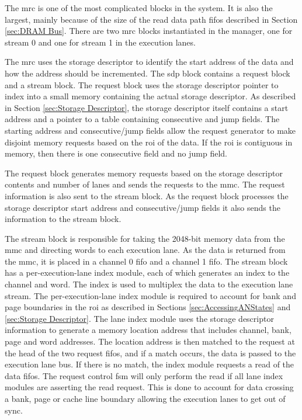 The \ac{mrc} is one of the most complicated blocks in the system.  It is also the largest, mainly because of the size of the read data path \acp{fifo} described in Section \ref{sec:DRAM Bus}.
There are two \ac{mrc} blocks instantiated in the manager, one for stream 0 and one for stream 1 in the execution lanes.

The \ac{mrc} uses the storage descriptor to identify the start address of the data and how the address should be incremented.
The \ac{sdp} block contains a request block and a stream block.
The request block uses the storage descriptor pointer to index into a small memory containing the actual storage descriptor. 
As described in Section \ref{sec:Storage Descriptor}, the storage descriptor itself contains a start address and a pointer to a table containing consecutive and jump fields.
The starting address and consecutive/jump fields allow the request generator to make disjoint memory requests based on the \ac{roi} of the data. 
If the \ac{roi} is contiguous in memory, then there is one consecutive field and no jump field.

The request block generates memory requests based on the storage descriptor contents and number of lanes and sends the requests to the \ac{mmc}.
The request information is also sent to the stream block.
As the request block processes the storage descriptor start address and consecutive/jump fields it also sends the information to the stream block.

The stream block is responsible for taking the 2048-bit memory data from the \ac{mmc} and directing words to each execution lane.
As the data is returned from the \ac{mmc}, it is placed in a channel 0 \ac{fifo} and a channel 1 \ac{fifo}. 
The stream block has a per-execution-lane index module, each of which generates an index to the channel and word.
The index is used to multiplex the data to the execution lane stream.
The per-execution-lane index module is required to account for bank and page boundaries in the \ac{roi} as described in Sections \ref{sec:AccessingANStates} and \ref{sec:Storage Descriptor}.
The lane index module uses the storage descriptor information to generate a memory location address that includes channel, bank, page and word addresses.
The location address is then matched to the request at the head of the two request \acp{fifo}, and if a match occurs, the data is passed to the execution lane bus.
If there is no match, the index module requests a read of the data \acp{fifo}. The request control \ac{fsm} will only perform the read if all lane index modules are asserting the read request.
This is done to account for data crossing a bank, page or cache line boundary allowing the execution lanes to get out of sync.


